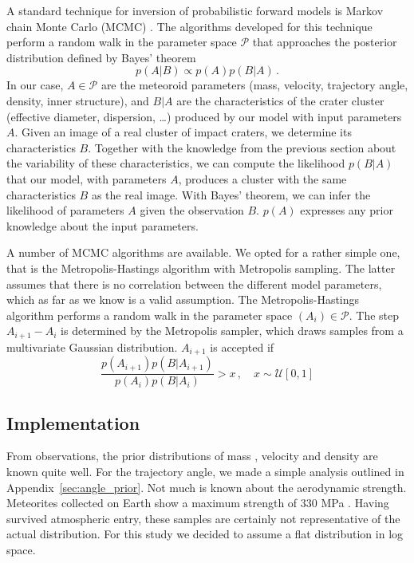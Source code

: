 \label{sec:inversion}
A standard technique for inversion of probabilistic forward models is Markov chain Monte Carlo (MCMC) \citep[e.g.,][]{gelfand1990sampling}. The algorithms developed for this technique perform a random walk in the parameter space $\mathcal{P}$ that approaches the posterior distribution defined by Bayes' theorem 
\begin{equation}
    p(A|B) \propto p(A)p(B|A)\,.
\end{equation}
In our case, $A \in \mathcal{P}$ are the meteoroid parameters (mass, velocity, trajectory angle, density, inner structure), and $B|A$ are the characteristics of the crater cluster (effective diameter, dispersion, \dots) produced by our model with input parameters $A$.
Given an image of a real cluster of impact craters, we determine its characteristics $B$. Together with the knowledge from the previous section about the variability of these characteristics, we can compute the likelihood $p(B|A)$ that our model, with parameters $A$, produces a cluster with the same characteristics $B$ as the real image.
With Bayes' theorem, we can infer the likelihood of parameters $A$ given the observation $B$. $p(A)$ expresses any prior knowledge about the input parameters.

A number of MCMC algorithms are available. 
We opted for a rather simple one, that is the Metropolis-Hastings algorithm \citep{10.1093/biomet/57.1.97} with Metropolis sampling.
The latter assumes that there is no correlation between the different model parameters, which as far as we know is a valid assumption.
The Metropolis-Hastings algorithm performs a random walk in the parameter space $(A_i) \in \mathcal{P}$.
The step $A_{i+1} - A_i$ is determined by the Metropolis sampler, which draws samples from a multivariate Gaussian distribution. $A_{i+1}$ is accepted if
\begin{equation}
    \frac{p(A_{i+1}) p(B|A_{i+1})}{p(A_{i}) p(B|A_{i})} > x\,,\quad x \sim \mathcal{U}[0, 1]
\end{equation}

\subsection{Implementation}

From observations, the prior distributions of mass \citep{bland2006rate}, velocity \citep{lefeuvre2011nonuniform} and density \citep{Zijans_source} are known quite well.
For the trajectory angle, we made a simple analysis outlined in Appendix~\ref{sec:angle_prior}. Not much is known about the aerodynamic strength. Meteorites collected on Earth show a maximum strength of 330 MPa \cite{popova2013chelyabinsk}. Having survived atmospheric entry, these samples are certainly not representative of the actual distribution. For this study we decided to assume a flat distribution in log space.

